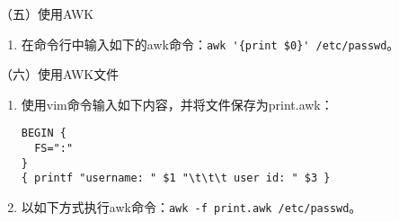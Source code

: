 \vspace{0.1in}
（五）使用AWK
\begin{enumerate}
  \item 在命令行中输入如下的awk命令：\verb|awk '{print $0}' /etc/passwd|。
\end{enumerate}

\vspace{0.1in}
（六）使用AWK文件
\begin{enumerate}
  \item 使用vim命令输入如下内容，并将文件保存为print.awk：
\begin{verbatim}
BEGIN {
  FS=":"
}
{ printf "username: " $1 "\t\t\t user id: " $3 }
\end{verbatim}
  \item 以如下方式执行awk命令：\verb|awk -f print.awk /etc/passwd|。
\end{enumerate}

